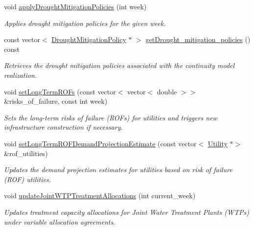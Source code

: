 \begin{DoxyCompactItemize}
void \mbox{\hyperlink{classContinuityModelRealization_a1841f4ca49c150cf5d790f6d42496575}{apply\+Drought\+Mitigation\+Policies}} (int week)
\begin{DoxyCompactList}\small\item\em Applies drought mitigation policies for the given week. \end{DoxyCompactList}\item 
const vector$<$ \mbox{\hyperlink{classDroughtMitigationPolicy}{Drought\+Mitigation\+Policy}} $\ast$ $>$ \mbox{\hyperlink{classContinuityModelRealization_afadb3e7f51ae7a09948ffc73d7eb7f6b}{get\+Drought\+\_\+mitigation\+\_\+policies}} () const
\begin{DoxyCompactList}\small\item\em Retrieves the drought mitigation policies associated with the continuity model realization. \end{DoxyCompactList}\item 
void \mbox{\hyperlink{classContinuityModelRealization_aa0168985144d26e1613cf20335affedb}{set\+Long\+Term\+R\+O\+Fs}} (const vector$<$ vector$<$ double $>$$>$ \&risks\+\_\+of\+\_\+failure, const int week)
\begin{DoxyCompactList}\small\item\em Sets the long-\/term risks of failure (R\+O\+Fs) for utilities and triggers new infrastructure construction if necessary. \end{DoxyCompactList}\item 
void \mbox{\hyperlink{classContinuityModelRealization_a5b9405156e8cc21c8781ea15ee46c8fe}{set\+Long\+Term\+R\+O\+F\+Demand\+Projection\+Estimate}} (const vector$<$ \mbox{\hyperlink{classUtility}{Utility}} $\ast$$>$ \&rof\+\_\+utilities)
\begin{DoxyCompactList}\small\item\em Updates the demand projection estimates for utilities based on risk of failure (R\+OF) utilities. \end{DoxyCompactList}\item 
void \mbox{\hyperlink{classContinuityModelRealization_ab87c140eaf87266ca81636059e948bb7}{update\+Joint\+W\+T\+P\+Treatment\+Allocations}} (int current\+\_\+week)
\begin{DoxyCompactList}\small\item\em Updates treatment capacity allocations for Joint Water Treatment Plants (W\+T\+Ps) under variable allocation agreements. \end{DoxyCompactList}\end{DoxyCompactItemize}
